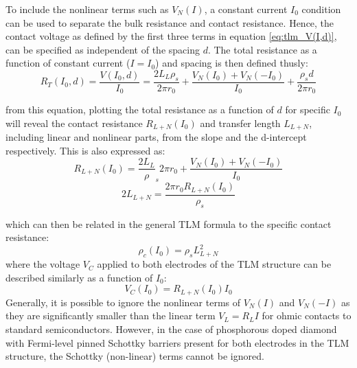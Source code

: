 To include the nonlinear terms such as $V_{N}(I)$, a constant current $I_{0}$ condition can be used to separate the bulk resistance and contact resistance. Hence, the contact voltage as defined by the first three terms in equation \ref{eq:tlm_V(I,d)}, can be specified as independent of the spacing $d$. The total resistance as a function of constant current ($I=I_{0}$) and spacing is then defined thusly:
\begin{equation}
    R_{T}(I_{0},d) = \frac{V(I_{0},d)}{I_{0}} = \frac{2L_{L}\rho_{s}}{2\pi r_{0}} + \frac{V_{N}(I_{0}) + V_{N}(-I_{0})}{I_{0}} + \frac{\rho_{s}d}{2\pi r_{0}}
    \label{eq:tlm_R(I,d)}
\end{equation}

from this equation, plotting the total resistance as a function of $d$ for specific $I_{0}$ will reveal the contact resistance $R_{L+N}(I_{0})$ and transfer length $L_{L+N}$, including linear and nonlinear parts, from the slope and the d-intercept respectively. This is also expressed as:
\begin{equation}
    R_{L+N}(I_{0}) = \frac{2L_{L}}\rho_{s}{2\pi r_{0}} + \frac{V_{N}(I_{0}) + V_{N}(-I_{0})}{I_{0}}
    \label{eq:tlm_contact_resistance_R_L+N}
\end{equation}
\begin{equation}
    2L_{L+N} = \frac{2\pi r_{0} R_{L+N}(I_{0})}{\rho_{s}}
    \label{eq:tlm_transfer_length_L_L+N}
\end{equation}

which can then be related in the general TLM formula to the specific contact resistance:
\begin{equation}
    \rho_{c}(I_{0}) = \rho_{s}L_{L+N}^{2}
    \label{eq:tlm_specific_contact_resistance_transfer_length_L+N}
\end{equation}
where the voltage $V_{C}$ applied to both electrodes of the TLM structure can be described similarly as a function of $I_{0}$:
\begin{equation}
    V_{C}(I_{0}) = R_{L+N}(I_{0})I_{0}
    \label{eq:tlm_voltage_V_C(I_0)}
\end{equation}
Generally, it is possible to ignore the nonlinear terms of $V_{N}(I)$ and $V_{N}(-I)$ as they are significantly smaller than the linear term $V_{L} = R_{L}I$ for ohmic contacts to standard semiconductors. However, in the case of phosphorous doped diamond with Fermi-level pinned Schottky barriers present for both electrodes in the TLM structure, the Schottky (non-linear) terms cannot be ignored.

